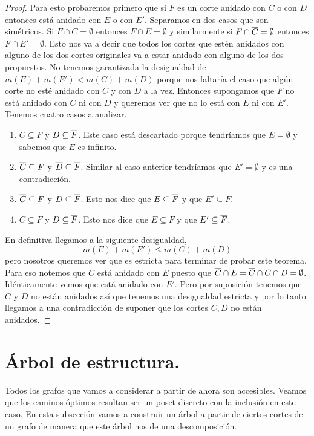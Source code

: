 \documentclass[tesis.tex]{subfiles}
\begin{document}
\begin{proof}
	Para esto probaremos primero que si $F$ es un corte anidado con $C$ o con $D$ entonces está anidado con $E$ o con $E'$.
	Separamos en dos casos que son simétricos.
	Si $F \cap C = \emptyset$ entonces $F \cap E= \emptyset$ y similarmente si $F \cap \overline C = \emptyset$ entonces $F \cap E' = \emptyset$.
	Esto nos va a decir que todos los cortes que estén anidados con alguno de los dos cortes originales va a estar anidado con alguno de los dos propuestos.
	No tenemos garantizada la desigualdad de $m(E) + m(E') < m(C) + m(D)$ porque nos faltaría el caso que algún corte no esté anidado con $C$ y con $D$ a la vez.
	Entonces supongamos que $F$ no está anidado con $C$ ni con $D$ y queremos ver que no lo está con $E$ ni con $E'$.
	Tenemos cuatro casos a analizar.
	\begin{enumerate}
		\item $C \subseteq F$ y $D \subseteq \overline F$.
		Este caso está descartado porque tendríamos que $E=\emptyset$ y sabemos que $E$ es infinito. 
		\item $\overline C \subseteq F$ y $\overline D \subseteq \overline F$.
		Similar al caso anterior tendríamos que $E' = \emptyset$ y es una contradicción.
		\item $\overline C \subseteq F$ y $D \subseteq \overline F$.
		Esto nos dice que $E \subseteq \overline F$ y que $E' \subseteq F$.
		\item $ C \subseteq F$ y $D \subseteq \overline F$.
		Esto nos dice que $E \subseteq F$ y que $E' \subseteq \overline F$.
	\end{enumerate}
	En definitiva llegamos a la siguiente desigualdad,
	\[
		m(E) + m(E') \le m(C) + m(D)
	\]
	pero nosotros queremos ver que es estricta para terminar de probar este teorema.
	Para eso notemos que $C$ está anidado con $E$ puesto que $\overline C \cap E = \overline C \cap C \cap D = \emptyset$.
	Idénticamente vemos que está anidado con $E'$.
	Pero por suposición tenemos que $C$ y $D$ no están anidados así que tenemos una desigualdad estricta y por lo tanto llegamos a una contradicción de suponer que los cortes $C,D$ no están anidados.
\end{proof}

\section{Árbol de estructura.}

Todos los grafos que vamos a considerar a partir de ahora son accesibles.
Veamos que los caminos óptimos resultan ser un poset discreto con la inclusión en este caso.
En esta subsección vamos a construir un árbol a partir de ciertos cortes de un grafo de manera que este árbol nos de una descomposición.
\end{document}
